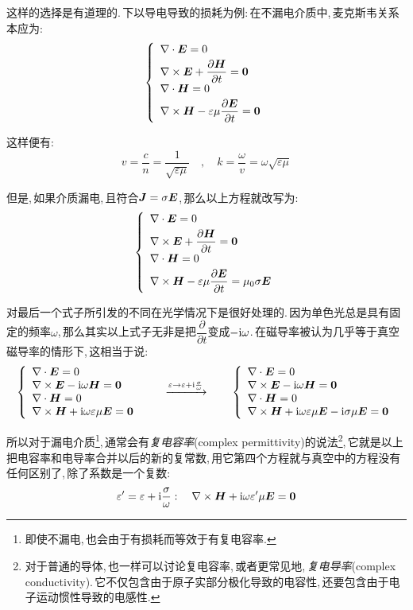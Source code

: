 这样的选择是有道理的.\,下以导电导致的损耗为例:\,在不漏电介质中,\,麦克斯韦关系本应为:
\[\left\{ \begin{array}{l} 
\nabla\cdot \boldsymbol{E}=0 \\[3pt] 
\nabla\times \boldsymbol{E}+\dfrac{\partial \boldsymbol{H}}{\partial t}=\boldsymbol{0} \\[3pt]
\nabla\cdot \boldsymbol{H}=0 \\[3pt]
\nabla\times \boldsymbol{H}-\varepsilon\mu\dfrac{\partial \boldsymbol{E}}{\partial t}=\boldsymbol{0} \end{array}\right.\]

这样便有:
\[v=\frac{c}{n}=\frac{1}{\sqrt{\varepsilon \mu}}\quad ,\quad k=\frac{\omega}{v}=\omega\sqrt{\varepsilon \mu}\]

但是,\,如果介质漏电,\,且符合$\boldsymbol{J}=\sigma \boldsymbol{E}$,\,那么以上方程就改写为:
\[\left\{ \begin{array}{l} 
\nabla\cdot \boldsymbol{E}=0 \\[3pt] 
\nabla\times \boldsymbol{E}+\dfrac{\partial \boldsymbol{H}}{\partial t}=\boldsymbol{0} \\[3pt]
\nabla\cdot \boldsymbol{H}=0 \\[3pt]
\nabla\times \boldsymbol{H}-\varepsilon\mu\dfrac{\partial \boldsymbol{E}}{\partial t}=\mu_0 \sigma \boldsymbol{E} \end{array}\right.\]

对最后一个式子所引发的不同在光学情况下是很好处理的.\,因为单色光总是具有固定的频率$\omega$,\,那么其实以上式子无非是把$\dfrac{\partial}{\partial t}$变成$-{\rm i} \omega$.\,在磁导率被认为几乎等于真空磁导率的情形下,\,这相当于说:
\[\left\{ \begin{array}{l} 
\nabla\cdot \boldsymbol{E}=0 \\ 
\nabla\times \boldsymbol{E}-{\rm i} \omega \boldsymbol{H}=\boldsymbol{0} \\
\nabla\cdot \boldsymbol{H}=0 \\
\nabla\times \boldsymbol{H}+{\rm i} \omega \varepsilon\mu\boldsymbol{E}=\boldsymbol{0} \end{array}\right. \qquad \xrightarrow{\varepsilon\rightarrow \varepsilon+{\rm i} \frac{\sigma}{\omega}} \qquad
\left\{ \begin{array}{l} 
\nabla\cdot \boldsymbol{E}=0 \\
\nabla\times \boldsymbol{E}-{\rm i} \omega \boldsymbol{H}=\boldsymbol{0}  \\
\nabla\cdot \boldsymbol{H}=0 \\
\nabla\times \boldsymbol{H}+{\rm i} \omega \varepsilon\mu\boldsymbol{E}-{\rm i}\sigma \mu \boldsymbol{E}=\boldsymbol{0} \end{array}\right.
\]

所以对于漏电介质\footnote{即使不漏电,\,也会由于有损耗而等效于有复电容率.},\,通常会有\emph{复电容率}(complex permittivity)的说法\footnote{对于普通的导体,\,也一样可以讨论复电容率,\,或者更常见地,\,\emph{复电导率}(complex conductivity).\,它不仅包含由于原子实部分极化导致的电容性,\,还要包含由于电子运动惯性导致的电感性.},\,它就是以上把电容率和电导率合并以后的新的复常数,\,用它第四个方程就与真空中的方程没有任何区别了,\,除了系数是一个复数:
\[\varepsilon^\prime =\varepsilon+{\rm i}\frac{\sigma}{\omega}:\quad \nabla\times \boldsymbol{H}+{\rm i} \omega \varepsilon^\prime\mu\boldsymbol{E}=\boldsymbol{0}\]

